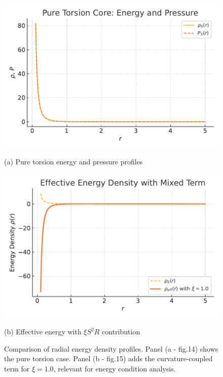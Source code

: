 \documentclass{article}
\begin{document}
\begin{figure}[h!]
\centering

\begin{minipage}{0.48\textwidth}
    \centering
    \includegraphics[width=\linewidth]{Fig_TorsionCoreProfile}
    \caption*{(a) Pure torsion energy and pressure profiles}
\end{minipage}
\hfill
\begin{minipage}{0.48\textwidth}
    \centering
    \includegraphics[width=\linewidth]{WEC_energy_density_profile}
    \caption*{(b) Effective energy with $\xi S^2 R$ contribution}
\end{minipage}

\caption{Comparison of radial energy density profiles. Panel (a - fig.14) shows the pure torsion case. Panel (b - fig.15) adds the curvature-coupled term for $\xi = 1.0$, relevant for energy condition analysis.}
\label{fig:torsion_energy_dual}
\end{figure}
\end{document}
